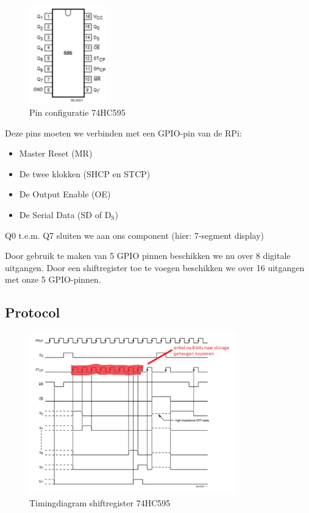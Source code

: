 \documentclass{article}
\begin{document}
\begin{figure}[H]
    \centering
    \includegraphics[width=0.3\textwidth]{shiftregister-pins.png}
    \caption{Pin configuratie 74HC595}
\end{figure}

Deze pins moeten we verbinden met een GPIO-pin van de RPi:
\begin{itemize}
    \item Master Reset (MR)
    \item De twee klokken (SHCP en STCP)
    \item De Output Enable (OE)
    \item De Serial Data (SD of $\text{D}_{\text{S}}$)
\end{itemize}

Q0 t.e.m. Q7 sluiten we aan ons component (hier: 7-segment display)

Door gebruik te maken van 5 GPIO pinnen beschikken we nu over 8 digitale uitgangen.
Door een shiftregister toe te voegen beschikken we over 16 uitgangen met onze 5 GPIO-pinnen.

\subsection{Protocol}

\begin{figure}[H]
    \centering
    \includegraphics[width=0.8\textwidth]{timing-shift.png}
    \caption{Timingdiagram shiftregister 74HC595}
\end{figure}
\end{document}
